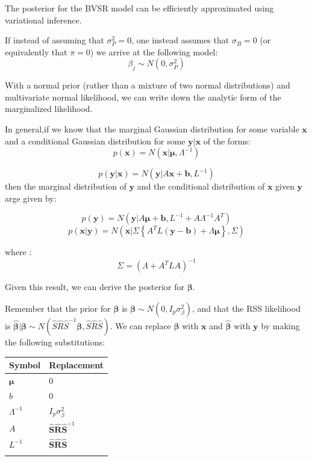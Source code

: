 The posterior for the BVSR model can be efficiently approximated using variational inference. 

If instead of assuming that \(\sigma^2_P=0\), one instead assumes that \(\sigma_B=0\) (or equivalently that \(\pi=0\)) we arrive at the following model: 
$$ \beta_j \sim N(0,\sigma^2_P)$$

With a normal prior (rather than a mixture of two normal distributions) and multivariate normal likelihood, we can write down the analytic form of the marginalized likelihood\cite{patternrecognition}.

In general,if we know that the marginal Gaussian distribution for some variable \(\textbf{x}\) and a conditional Gaussian distribution for some \(\textbf{y}|\textbf{x}\) of the forms:
$$p(\textbf{x}) = N(\textbf{x}|\boldsymbol{\mu},\Lambda^{-1})$$

$$p(\textbf{y}|\textbf{x}) = N(\textbf{y}|A\textbf{x}+\textbf{b},L^{-1})$$
then the marginal distribution of \(\textbf{y}\) and the conditional distribution of \(\textbf{x}\) given \(\textbf{y}\) arge given by: 

$$ p(\textbf{y}) = N(\textbf{y}|A\boldsymbol{\mu}+\textbf{b},L^{-1}+A\Lambda^{-1}A^{T})$$
$$p(\textbf{x}|\textbf{y}) = N(\textbf{x}| \Sigma \left\{ A^{T} L ( \textbf{y} - \textbf{b} ) + \Lambda \boldsymbol{\mu} \right\} , \Sigma)$$

where :
$$\Sigma = (\Lambda + A^{T}LA)^{-1}$$

Given this result, we can derive the posterior for \(\boldsymbol{\beta}\).

Remember that the prior for \(\boldsymbol{\beta}\) is \(\boldsymbol{\beta} \sim N(0,I_p\sigma^2_\beta)\), and that the RSS likelihood is \(\hat{\boldsymbol{\beta}} | \boldsymbol{\beta} \sim N(\hat{S}\hat{R}\hat{S}^{-1}\boldsymbol{\beta},\hat{S}\hat{R}\hat{S})\).  
We can replace \(\boldsymbol{\beta}\) with \(\textbf{x}\) and \(\hat{\boldsymbol{\beta}}\) with \(\textbf{y}\) by making the following substitutions:

\begin{center}
\begin{tabular}{ll}
Symbol & Replacement\\
\hline
\(\boldsymbol{\mu}\) & \(0\)\\
\(b\) & \(0\)\\
\(\Lambda^{-1}\) & \(I_p \sigma^2_\beta\)\\
\(A\) & \(\hat{\textbf{S}}\hat{\textbf{R}}\hat{\textbf{S}}^{-1}\)\\
\(L^{-1}\) & \(\hat{\textbf{S}}\hat{\textbf{R}}\hat{\textbf{S}}\)\\
 & \\
\end{tabular}
\end{center}

